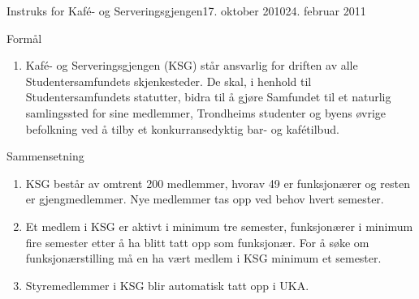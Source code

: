 \begin{instruks}{Instruks for Kaf\'e- og Serveringsgjengen}{17. oktober 2010}{24. februar 2011}

    \begin{instruksledd}{Formål}
        \begin{enumerate}
            \item Kafé- og Serveringsgjengen (KSG) står ansvarlig for driften av alle
                Studentersamfundets skjenkesteder. De skal, i henhold til Studentersamfundets statutter, bidra til å
                gjøre Samfundet til et naturlig samlingssted for sine medlemmer, Trondheims studenter og byens
                øvrige befolkning ved å tilby et konkurransedyktig bar- og kafétilbud.
        \end{enumerate}
    \end{instruksledd}

    \begin{instruksledd}{Sammensetning}
        \begin{enumerate}
            \item KSG består av omtrent 200 medlemmer, hvorav 49 er funksjonærer og resten er
                gjengmedlemmer. Nye medlemmer tas opp ved behov hvert semester.
            \item Et medlem i KSG er aktivt i minimum tre semester, funksjonærer i minimum fire
                semester etter å ha blitt tatt opp som funksjonær. For å søke om funksjonærstilling må en ha vært
                medlem i KSG minimum et semester.
            \item Styremedlemmer i KSG blir automatisk tatt opp i UKA.
        \end{enumerate}
    \end{instruksledd}


\end{instruks}
